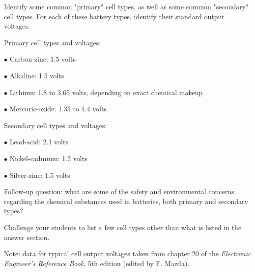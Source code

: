 

Identify some common "primary" cell types, as well as some common "secondary" cell types.  For each of these battery types, identify their standard output voltages.







\noindent
Primary cell types and voltages:

\item{$\bullet$} Carbon-zinc: 1.5 volts
\item{$\bullet$} Alkaline: 1.5 volts
\item{$\bullet$} Lithium: 1.8 to 3.65 volts, depending on exact chemical makeup
\item{$\bullet$} Mercuric-oxide: 1.35 to 1.4 volts

\vskip 10pt

\noindent
Secondary cell types and voltages:

\item{$\bullet$} Lead-acid: 2.1 volts
\item{$\bullet$} Nickel-cadmium: 1.2 volts
\item{$\bullet$} Silver-zinc: 1.5 volts

\vskip 10pt

Follow-up question: what are some of the safety and environmental concerns regarding the chemical substances used in batteries, both primary and secondary types?







Challenge your students to list a few cell types other than what is listed in the answer section.

\vskip 10pt

Note: data for typical cell output voltages taken from chapter 20 of the {\it Electronic Engineer's Reference Book}, 5th edition (edited by F. Mazda).




